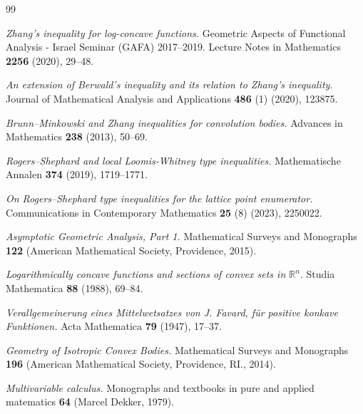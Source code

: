 \documentclass[10pt]{amsart}
\def\R{\mathbb{R}}
\numberwithin{equation}{section}
\begin{document}
\begin{thebibliography}{99}

\textit{Zhang's inequality for log-concave functions.}
Geometric Aspects of Functional Analysis - Israel Seminar (GAFA) 2017--2019. Lecture Notes in Mathematics {\bf 2256} (2020), 29--48.

\textit{An extension of Berwald's inequality and its relation to Zhang's inequality.}
Journal of Mathematical Analysis and Applications {\bf 486} (1) (2020), 123875.

\textit{Brunn--Minkowski and Zhang inequalities for convolution bodies.}
Advances in Mathematics {\bf 238} (2013), 50--69.

\textit{Rogers--Shephard and local Loomis-Whitney type inequalities.}
 Mathematische Annalen {\bf 374} (2019), 1719--1771.


\textit{On Rogers--Shephard type inequalities for the lattice point enumerator.}
Communications in Contemporary Mathematics {\bf 25} (8) (2023), 2250022.

\textit{Asymptotic Geometric Analysis, Part 1.}
Mathematical Surveys and Monographs {\bf 122} (American Mathematical Society, Providence, 2015).

\textit{Logarithmically concave functions and sections of convex sets in $\R^n$}.
Studia Mathematica {\bf 88} (1988),  69--84.

\textit{Verallgemeinerung eines Mittelwetsatzes von J. Favard, f\"ur positive konkave Funktionen.}
Acta Mathematica {\bf 79}  (1947), 17--37.

 \textit{Geometry of Isotropic Convex Bodies.}
Mathematical Surveys and Monographs {\bf 196} (American Mathematical Society, Providence, RI., 2014).

\textit{Multivariable calculus.}
Monographs and textbooks in pure and applied matematics {\bf 64} (Marcel Dekker, 1979).


\end{thebibliography}
\end{document}
